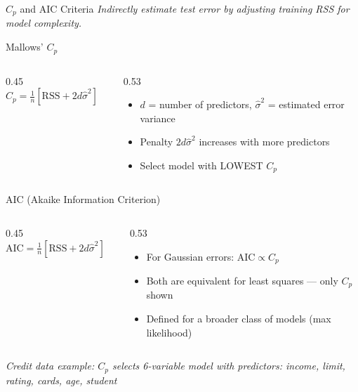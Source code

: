 \documentclass[ignorenonframetext,]{beamer}
\begin{document}
\begin{frame}{$C_p$ and AIC Criteria}
\vspace{4pt}
{\small\emph{Indirectly estimate test error by adjusting training RSS for model complexity.}}

\begin{block}{Mallows' $C_p$}
\begin{columns}[T]
\begin{column}{0.45\textwidth}
\vspace{2pt}
\centering $\displaystyle C_p = \frac{1}{n}\left[\mathrm{RSS} + 2d\hat{\sigma}^2\right]$
\end{column}
\begin{column}{0.53\textwidth}
\scriptsize
\begin{itemize}
	\item $d$ = number of predictors, $\hat{\sigma}^2$ = estimated error variance
	\item Penalty $2d\hat{\sigma}^2$ increases with more predictors
	\item Select model with LOWEST $C_p$
\end{itemize}
\end{column}
\end{columns}
\end{block}

\vspace{-4pt}
\begin{exampleblock}{AIC (Akaike Information Criterion)}
\begin{columns}[T]
\begin{column}{0.45\textwidth}
\vspace{2pt}
\centering $\displaystyle \mathrm{AIC} = \frac{1}{n}\left[\mathrm{RSS} + 2d\hat{\sigma}^2\right]$
\end{column}
\begin{column}{0.53\textwidth}
\scriptsize
\begin{itemize}
	\item For Gaussian errors: $\mathrm{AIC} \propto C_p$
	\item Both are equivalent for least squares --- only $C_p$ shown
	\item Defined for a broader class of models (max likelihood)
\end{itemize}
\end{column}
\end{columns}
\end{exampleblock}

{\tiny\emph{Credit data example: $C_p$ selects 6-variable model with predictors: income, limit, rating, cards, age, student}}
\end{frame}
\end{document}
